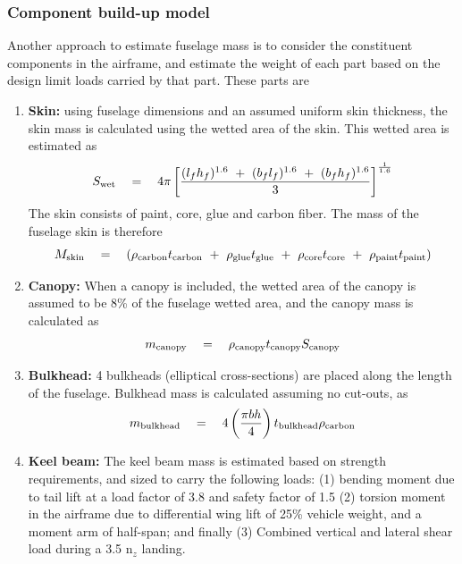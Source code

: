 \subsubsection{Component build-up model}
Another approach to estimate fuselage mass is to consider the constituent components in the airframe, and estimate the weight of each part based on the design limit loads carried by that part. These parts are 
\begin{enumerate}
\item \textbf{Skin:} using fuselage dimensions and an assumed uniform skin thickness, the skin mass is calculated using the wetted area of the skin. This wetted area is estimated as 
\begin{equation}
S_{\rm wet} \quad = \quad 4\pi \left[\frac{(l_f h_f)^{1.6} \textrm{ }+\textrm{ } (b_f l_f)^{1.6} \textrm{ }+\textrm{ } (b_fh_f)^{1.6}}{3}\right]^{\frac{1}{1.6}}
\end{equation}
The skin consists of paint, core, glue and carbon fiber. The mass of the fuselage skin is therefore
\begin{equation}
M_{\rm skin} \quad = \quad (\rho_{\rm carbon} t_{\rm carbon} \textrm{ }+\textrm{ } \rho_{\rm glue} t_{\rm glue} \textrm{ }+\textrm{ } \rho_{\rm core} t_{\rm core} \textrm{ }+\textrm{ } \rho_{\rm paint} t_{\rm paint})
\end{equation}

\item \textbf{Canopy:} When a canopy is included, the wetted area of the canopy is assumed to be 8\% of the fuselage wetted area, and the canopy mass is calculated as 
\begin{equation}
m_{\rm canopy} \quad = \quad \rho_{\rm canopy} t_{\rm canopy} S_{\rm canopy}
\end{equation}
\item \textbf{Bulkhead:} 4 bulkheads (elliptical cross-sections) are placed along the length of the fuselage. Bulkhead mass is calculated assuming no cut-outs, as 
\begin{equation}
m_{\rm bulkhead} \quad = \quad 4 \left(\frac{\pi bh}{4}\right) t_{\rm bulkhead} \rho_{\rm carbon}
\end{equation}
\item \textbf{Keel beam:} The keel beam mass is estimated based on strength requirements, and sized to carry the following loads: (1) bending moment due to tail lift at a load factor of 3.8 and safety factor of 1.5 (2) torsion moment in the airframe due to differential wing lift of 25\% vehicle weight, and a moment arm of half-span; and finally (3) Combined vertical and lateral shear load during a 3.5 n$_z$ landing.
\end{enumerate}

